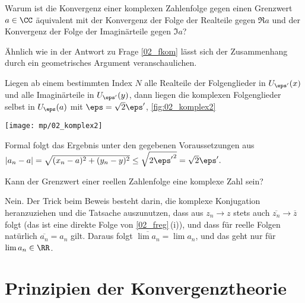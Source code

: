 \begin{frage}%
  \label{02_fkoma}
  Warum ist die Konvergenz einer komplexen Zahlenfolge gegen einen Grenzwert 
  $a\in\CC$ äquivalent mit der Konvergenz der Folge der Realteile gegen 
  $\Re a$ und der Konvergenz der Folge der Imaginärteile gegen $\Im a$?
\end{frage}

\begin{antwort}
  Ähnlich wie in der Antwort zu Frage \ref{02_fkom}
  lässt sich der Zusammenhang 
  durch ein geometrisches Argument veranschaulichen. 

  Liegen ab einem bestimmten Index $N$ alle Realteile der Folgenglieder 
  in $U_{\eps'}(x)$ und alle Imaginärteile in $U_{\eps'}(y)$, dann liegen 
  die komplexen Folgenglieder selbst in $U_{\eps}(a)$ mit 
  $\eps=\sqrt{2} \eps'$, \sieheAbbildung\ref{fig:02_komplex2}

  \begin{center}
    \texttt{[image: mp/02\_komplex2]}
    \label{fig:02_komplex2}
  \end{center}
  Formal folgt das Ergebnis unter den gegebenen Voraussetzungen aus
  $|a_n-a| = \sqrt{ (x_n-a)^2 + (y_n-y)^2 } \le \sqrt{2{\eps'}^2} 
  = \sqrt{2}\eps'.$ \AntEnd
\end{antwort}

\begin{frage}%
  \label{02_gkom}
  Kann der Grenzwert einer reellen Zahlenfolge eine komplexe Zahl sein?
\end{frage}

\begin{antwort}
  Nein. Der Trick beim Beweis besteht darin, 
  die komplexe Konjugation heranzuziehen  
  und die Tatsache auszunutzen, dass aus $z_n\to z$ stets auch 
  $\overline{z_n}\to \overline{z}$ folgt 
  (das ist eine direkte Folge von \ref{02_freg}\,(i)), und dass 
  für reelle Folgen natürlich $\overline{a_n}=a_n$ gilt. Daraus folgt 
  $\overline{\lim a_n}=\lim a_n$, und das geht nur 
  für $\lim a_n \in \RR$.
  \AntEnd  
\end{antwort} 



\section{Prinzipien der Konvergenztheorie}

